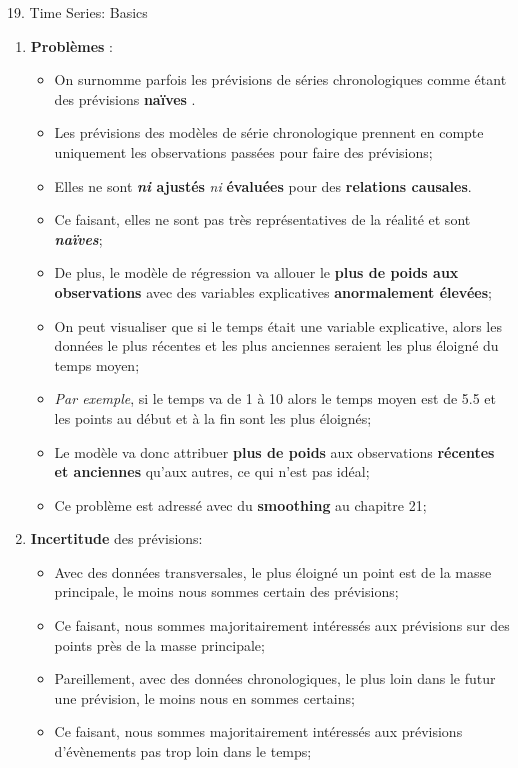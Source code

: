 \documentclass[12pt, titlepage, french]{report}
\begin{document}
\begin{CHPT_SUMM}{19. Time Series: Basics}
\begin{enumerate}
\begin{itemize}
		\texttt{[image: src/time-series-plots.png]}
		\end{itemize}
	\item[]	\textbf{Problèmes} :
		\begin{itemize}
		\item	On surnomme parfois les prévisions de séries chronologiques comme étant des prévisions \og \textbf{naïves} \fg{}. 
		\item[]	Les prévisions des modèles de série chronologique prennent en compte uniquement les observations passées pour faire des prévisions;
		\item[]	Elles ne sont \textbf{\textit{ni} ajustés} \textit{ni} \textbf{évaluées} pour des \textbf{relations causales}. 
		\item[]	Ce faisant, elles ne sont pas très représentatives de la réalité et sont \textbf{\textit{naïves}};
		\item	De plus, le modèle de régression va allouer le \textbf{plus de poids aux observations} avec des variables explicatives \textbf{anormalement élevées};
		\item[]	On peut visualiser que si le temps était une variable explicative, alors les données le plus récentes et les plus anciennes seraient les plus éloigné du temps moyen;
		\item[]	\textit{Par exemple}, si le temps va de 1 à 10 alors le temps moyen est de 5.5 et les points au début et à la fin sont les plus éloignés;
		\item[]	Le modèle va donc attribuer \textbf{plus de poids} aux observations \textbf{récentes et anciennes} qu'aux autres, ce qui n'est pas idéal;
		\item[]	Ce problème est adressé avec du \textbf{smoothing} au chapitre 21;		
		\end{itemize} 
	\item[]	\textbf{Incertitude} des prévisions:
		\begin{itemize}
		\item	Avec des données transversales, le plus éloigné un point est de la masse principale, le moins nous sommes certain des prévisions;
		\item[]	Ce faisant, nous sommes majoritairement intéressés aux prévisions sur des points près de la masse principale;
		\item 	Pareillement, avec des données chronologiques, le plus loin dans le futur une prévision, le moins nous en sommes certains;
		\item[]	Ce faisant, nous sommes majoritairement intéressés aux prévisions d'évènements pas trop loin dans le temps; 

\end{itemize}
\end{enumerate}
\end{CHPT_SUMM}
\end{document}
